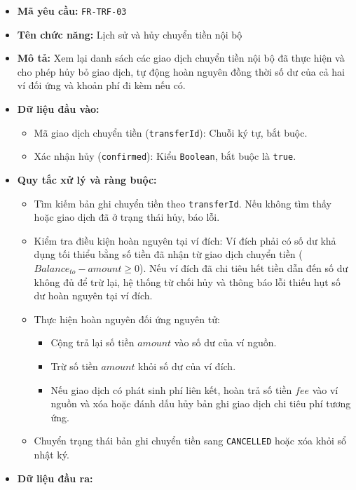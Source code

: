 \documentclass[11pt,a4paper]{article}
\providecommand{\tightlist}{
  \setlength{\itemsep}{0pt}\setlength{\parskip}{0pt}}
\begin{document}
\begin{itemize}
\tightlist
\item
  \textbf{Mã yêu cầu:} \texttt{FR-TRF-03}
\item
  \textbf{Tên chức năng:} Lịch sử và hủy chuyển tiền nội bộ
\item
  \textbf{Mô tả:} Xem lại danh sách các giao dịch chuyển tiền nội bộ đã
  thực hiện và cho phép hủy bỏ giao dịch, tự động hoàn nguyên đồng thời
  số dư của cả hai ví đối ứng và khoản phí đi kèm nếu có.
\item
  \textbf{Dữ liệu đầu vào:}

  \begin{itemize}
  \tightlist
  \item
    Mã giao dịch chuyển tiền (\texttt{transferId}): Chuỗi ký tự, bắt
    buộc.
  \item
    Xác nhận hủy (\texttt{confirmed}): Kiểu \texttt{Boolean}, bắt buộc
    là \texttt{true}.
  \end{itemize}
\item
  \textbf{Quy tắc xử lý và ràng buộc:}

  \begin{itemize}
  \tightlist
  \item
    Tìm kiếm bản ghi chuyển tiền theo \texttt{transferId}. Nếu không tìm
    thấy hoặc giao dịch đã ở trạng thái hủy, báo lỗi.
  \item
    Kiểm tra điều kiện hoàn nguyên tại ví đích: Ví đích phải có số dư
    khả dụng tối thiểu bằng số tiền đã nhận từ giao dịch chuyển tiền
    (\(Balance_{to} - amount \ge 0\)). Nếu ví đích đã chi tiêu hết tiền
    dẫn đến số dư không đủ để trừ lại, hệ thống từ chối hủy và thông báo
    lỗi thiếu hụt số dư hoàn nguyên tại ví đích.
  \item
    Thực hiện hoàn nguyên đối ứng nguyên tử:

    \begin{itemize}
    \tightlist
    \item
      Cộng trả lại số tiền \(amount\) vào số dư của ví nguồn.
    \item
      Trừ số tiền \(amount\) khỏi số dư của ví đích.
    \item
      Nếu giao dịch có phát sinh phí liên kết, hoàn trả số tiền \(fee\)
      vào ví nguồn và xóa hoặc đánh dấu hủy bản ghi giao dịch chi tiêu
      phí tương ứng.
    \end{itemize}
  \item
    Chuyển trạng thái bản ghi chuyển tiền sang \texttt{CANCELLED} hoặc
    xóa khỏi sổ nhật ký.
  \end{itemize}
\item
  \textbf{Dữ liệu đầu ra:}


\end{itemize}
\end{document}
